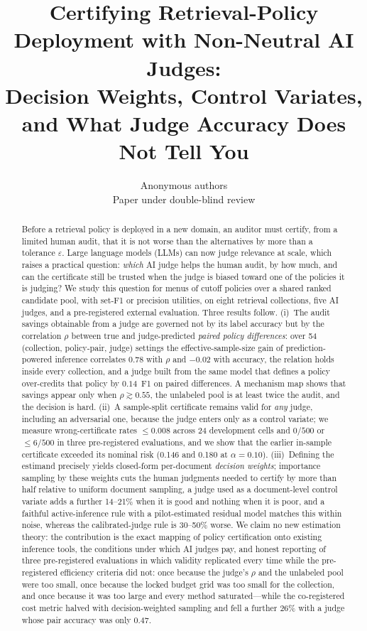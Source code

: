 \documentclass{article}
\title{Certifying Retrieval-Policy Deployment with Non-Neutral AI Judges:\\ Decision Weights, Control Variates, and What Judge Accuracy Does Not Tell You}
\author{\name Anonymous authors \\ \addr Paper under double-blind review}
\newcommand{\eps}{\varepsilon}
\begin{document}
\maketitle

\begin{abstract}
Before a retrieval policy is deployed in a new domain, an auditor must certify, from a limited human audit, that it is not worse than the alternatives by more than a tolerance $\eps$. Large language models (LLMs) can now judge relevance at scale, which raises a practical question: \emph{which} AI judge helps the human audit, by how much, and can the certificate still be trusted when the judge is biased toward one of the policies it is judging? We study this question for menus of cutoff policies over a shared ranked candidate pool, with set-F1 or precision utilities, on eight retrieval collections, five AI judges, and a pre-registered external evaluation. Three results follow. (i)~The audit savings obtainable from a judge are governed not by its label accuracy but by the correlation $\rho$ between true and judge-predicted \emph{paired policy differences}: over 54 (collection, policy-pair, judge) settings the effective-sample-size gain of prediction-powered inference correlates $0.78$ with $\rho$ and $-0.02$ with accuracy, the relation holds inside every collection, and a judge built from the same model that defines a policy over-credits that policy by $0.14$~F1 on paired differences. A mechanism map shows that savings appear only when $\rho \gtrsim 0.55$, the unlabeled pool is at least twice the audit, and the decision is hard. (ii)~A sample-split certificate remains valid for \emph{any} judge, including an adversarial one, because the judge enters only as a control variate; we measure wrong-certificate rates $\le 0.008$ across 24 development cells and $0/500$ or $\le 6/500$ in three pre-registered evaluations, and we show that the earlier in-sample certificate exceeded its nominal risk (0.146 and 0.180 at $\alpha=0.10$). (iii)~Defining the estimand precisely yields closed-form per-document \emph{decision weights}; importance sampling by these weights cuts the human judgments needed to certify by more than half relative to uniform document sampling, a judge used as a document-level control variate adds a further 14--21\% when it is good and nothing when it is poor, and a faithful active-inference rule with a pilot-estimated residual model matches this within noise, whereas the calibrated-judge rule is 30--50\% worse. We claim no new estimation theory: the contribution is the exact mapping of policy certification onto existing inference tools, the conditions under which AI judges pay, and honest reporting of three pre-registered evaluations in which validity replicated every time while the pre-registered efficiency criteria did not: once because the judge's $\rho$ and the unlabeled pool were too small, once because the locked budget grid was too small for the collection, and once because it was too large and every method saturated---while the co-registered cost metric halved with decision-weighted sampling and fell a further 26\% with a judge whose pair accuracy was only $0.47$.
\end{abstract}
\end{document}
